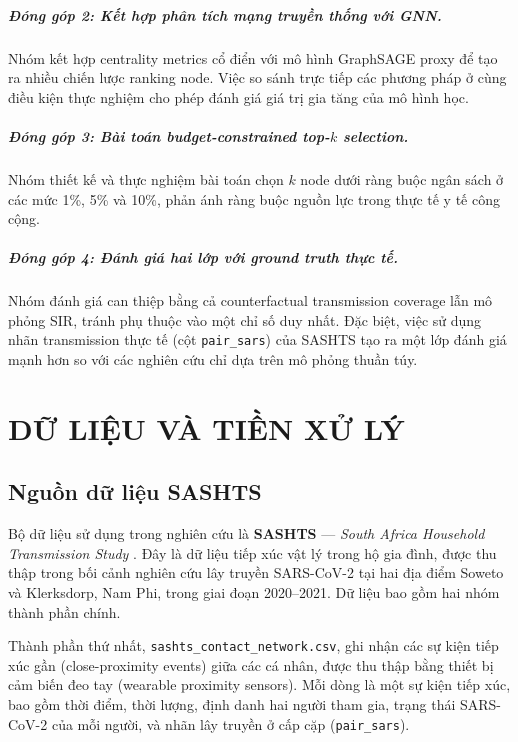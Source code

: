 \documentclass[12pt,a4paper]{report}
\theoremstyle{definition}
\begin{document}
\paragraph{Đóng góp 2: Kết hợp phân tích mạng truyền thống với GNN.} Nhóm kết hợp centrality metrics cổ điển với mô hình GraphSAGE proxy để tạo ra nhiều chiến lược ranking node. Việc so sánh trực tiếp các phương pháp ở cùng điều kiện thực nghiệm cho phép đánh giá giá trị gia tăng của mô hình học.

\paragraph{Đóng góp 3: Bài toán budget-constrained top-$k$ selection.} Nhóm thiết kế và thực nghiệm bài toán chọn $k$ node dưới ràng buộc ngân sách ở các mức 1\%, 5\% và 10\%, phản ánh ràng buộc nguồn lực trong thực tế y tế công cộng.

\paragraph{Đóng góp 4: Đánh giá hai lớp với ground truth thực tế.} Nhóm đánh giá can thiệp bằng cả counterfactual transmission coverage lẫn mô phỏng SIR, tránh phụ thuộc vào một chỉ số duy nhất. Đặc biệt, việc sử dụng nhãn transmission thực tế (cột \texttt{pair\_sars}) của SASHTS tạo ra một lớp đánh giá mạnh hơn so với các nghiên cứu chỉ dựa trên mô phỏng thuần túy.

\chapter{DỮ LIỆU VÀ TIỀN XỬ LÝ}

\section{Nguồn dữ liệu SASHTS}

Bộ dữ liệu sử dụng trong nghiên cứu là \textbf{SASHTS} --- \textit{South Africa Household Transmission Study} \cite{sashts2021}. Đây là dữ liệu tiếp xúc vật lý trong hộ gia đình, được thu thập trong bối cảnh nghiên cứu lây truyền SARS-CoV-2 tại hai địa điểm Soweto và Klerksdorp, Nam Phi, trong giai đoạn 2020--2021. Dữ liệu bao gồm hai nhóm thành phần chính.

Thành phần thứ nhất, \texttt{sashts\_contact\_network.csv}, ghi nhận các sự kiện tiếp xúc gần (close-proximity events) giữa các cá nhân, được thu thập bằng thiết bị cảm biến đeo tay (wearable proximity sensors). Mỗi dòng là một sự kiện tiếp xúc, bao gồm thời điểm, thời lượng, định danh hai người tham gia, trạng thái SARS-CoV-2 của mỗi người, và nhãn lây truyền ở cấp cặp (\texttt{pair\_sars}).
\end{document}
